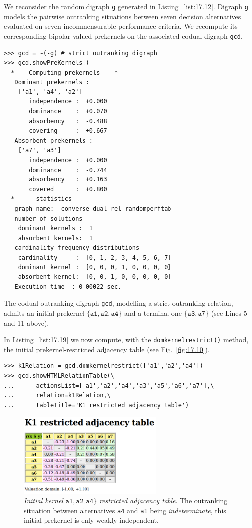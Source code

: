 \noindent We reconsider the random digraph \texttt{g} generated in Listing~\vref{list:17.12}. Digraph \texttt{g} models the pairwise outranking situations between seven decision alternatives evaluated on seven incommensurable performance criteria. We recompute its corresponding bipolar-valued prekernels on the associated codual digraph \texttt{gcd}.
\begin{lstlisting}
>>> gcd = ~(-g) # strict outranking digraph
>>> gcd.showPreKernels()
  *--- Computing prekernels ---*
   Dominant prekernels :
    ['a1', 'a4', 'a2']
       independence :  +0.000
       dominance    :  +0.070
       absorbency   :  -0.488
       covering     :  +0.667
   Absorbent prekernels :
    ['a7', 'a3']
       independence :  +0.000
       dominance    :  -0.744
       absorbency   :  +0.163
       covered      :  +0.800
  *----- statistics -----
   graph name:  converse-dual_rel_randomperftab
   number of solutions
    dominant kernels :  1
    absorbent kernels:  1
   cardinality frequency distributions
    cardinality     :  [0, 1, 2, 3, 4, 5, 6, 7]
    dominant kernel :  [0, 0, 0, 1, 0, 0, 0, 0]
    absorbent kernel:  [0, 0, 1, 0, 0, 0, 0, 0]
   Execution time  : 0.00022 sec.
\end{lstlisting}

The codual outranking digraph \texttt{gcd}, modelling a strict outranking relation, admits an initial prekernel $\{\mathtt{a1}, \mathtt{a2}, \mathtt{a4}\}$ and a terminal one $\{\mathtt{a3}, \mathtt{a7}\}$ (see Lines 5 and 11 above).

In Listing~\vref{list:17.19} we now compute, with the \texttt{domkernelrestrict()} method, the initial prekernel-restricted adjacency table (see Fig.~\vref{fig:17.10}).
\begin{lstlisting}[caption={Computing a dominant prekernel restricted adjancecy table},label=list:17.19]
>>> k1Relation = gcd.domkernelrestrict(['a1','a2','a4'])
>>> gcd.showHTMLRelationTable(\
...      actionsList=['a1','a2','a4','a3','a5','a6','a7'],\
...      relation=k1Relation,\
...      tableTitle='K1 restricted adjacency table')
\end{lstlisting}
\begin{figure}[ht]
\sidecaption[t]
\includegraphics[width=7cm]{Figures/17-10-k1restricted.png}
\caption[Initial kernel $\{\mathtt{a1}, \mathtt{a2}, \mathtt{a4}\}$ restricted adjacency table]{\emph{Initial kernel} $\mathtt{a1}, \mathtt{a2}, \mathtt{a4}\}$ \emph{restricted adjacency table}. The outranking situation between alternatives \texttt{a4} and \texttt{a1} being \emph{indeterminate}, this initial prekernel is only weakly independent. }
\label{fig:17.10}       %
\end{figure}

